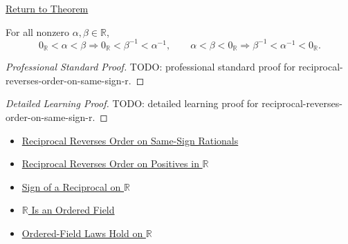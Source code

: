 \newpage
{}
\label{prf:reciprocal-reverses-order-on-same-sign-r}

\begin{remark*}[Return]
\hyperref[thm:reciprocal-reverses-order-on-same-sign-r]{Return to Theorem}
\end{remark*}

\begin{theorem*}
For all nonzero $\alpha,\beta\in\mathbb{R}$,
\[
0_{\mathbb{R}}<\alpha<\beta
\Longrightarrow
0_{\mathbb{R}}<\beta^{-1}<\alpha^{-1},
\qquad
\alpha<\beta<0_{\mathbb{R}}
\Longrightarrow
\beta^{-1}<\alpha^{-1}<0_{\mathbb{R}}.
\]
\end{theorem*}

\begin{proof}[Professional Standard Proof]
\LRAProofBodyStart
TODO: professional standard proof for reciprocal-reverses-order-on-same-sign-r.
\end{proof}

\begin{proof}[Detailed Learning Proof]
\LRAProofBodyStart
TODO: detailed learning proof for reciprocal-reverses-order-on-same-sign-r.
\end{proof}

\begin{remark*}
\end{remark*}

\begin{dependencies}
\begin{itemize}
  \item \hyperref[thm:reciprocal-reverses-order-on-same-sign-q]{Reciprocal Reverses Order on Same-Sign Rationals}
  \item \hyperref[thm:reciprocal-reverses-order-on-positives-r]{Reciprocal Reverses Order on Positives in $\mathbb{R}$}
  \item \hyperref[thm:sign-of-reciprocal-r]{Sign of a Reciprocal on $\mathbb{R}$}
  \item \hyperref[thm:r-is-an-ordered-field]{$\mathbb{R}$ Is an Ordered Field}
  \item \hyperref[cor:ordered-field-laws-on-r]{Ordered-Field Laws Hold on $\mathbb{R}$}
\end{itemize}
\end{dependencies}

\clearpage

